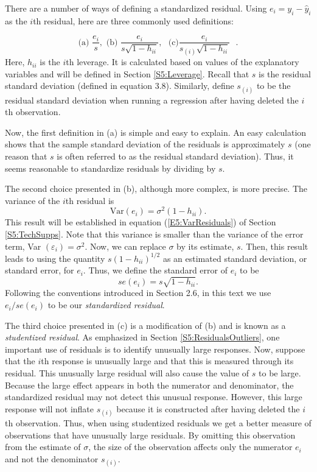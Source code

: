 There are a number of ways of defining a standardized residual.
Using $e_i = y_i-\hat{y}_i$ as the $i$th residual, here are three
commonly used definitions:

\begin{equation} \label{E5:StdResid}
\text{(a) }\frac{e_i}{s},\text{ \ \ \ (b) }\frac{e_i}{s\sqrt{
1-h_{ii}}}, \text { \  \   \   }\text{(c)
}\frac{e_i}{s_{(i)}\sqrt{1-h_{ii}}}\text{\ }.
\end{equation}
 \noindent Here, $h_{ii}$ is the $i$th leverage. It
is calculated based on values of the explanatory variables and will
be defined in Section \ref{S5:Leverage}. Recall that $s$ is the
residual standard deviation (defined in equation 3.8). Similarly,
define $s_{(i)}$ to be the residual standard deviation when running
a regression after having deleted the $i$th observation.

Now, the first definition in (a) is simple and easy to explain. An
easy calculation shows that the sample standard deviation of the
residuals is approximately $s$ (one reason that $s$ is often
referred to as the residual standard deviation). Thus, it seems
reasonable to standardize residuals by dividing by $s$.

The second choice presented in (b), although more complex, is more
precise. The variance of the $i$th residual is
\begin{equation*}
\mathrm{Var}(e_i)=\sigma ^2(1-h_{ii}).
\end{equation*}
This result will be established in equation (\ref{E5:VarResiduals})
of Section \ref{S5:TechSupps}. Note that this variance is smaller
than the variance of the error term, Var $(\varepsilon_i)=\sigma
^2$. Now, we can replace $\sigma $ by its estimate, $s$. Then, this
result leads to using the quantity $s(1-h_{ii})^{1/2}$ as an
estimated standard deviation, or standard error, for $e_i$. Thus, we
define the standard error of $e_i$ to be
\begin{equation*}
se(e_i)=s \sqrt{1-h_{ii}}.
\end{equation*}
Following the conventions introduced in Section 2.6, in this text we
use $e_i/se(e_i)$ to be our \textit{standardized residual}.


The third choice presented in (c) is a modification of (b) and is
known as a \textit{studentized residual}. As emphasized in Section
\ref{S5:ResidualsOutliers}, one important use of residuals is to
identify unusually large responses. Now, suppose that the $i$th
response is unusually large and that this is measured through its
residual. This unusually large residual will also cause the value of
$s$ to be large. Because the large effect appears in both the
numerator and denominator, the standardized residual may not detect
this unusual response. However, this large response will not inflate
$s_{(i)}$ because it is constructed after having deleted the $i$th
observation. Thus, when using studentized residuals we get a better
measure of observations that have unusually large residuals. By
omitting this observation from the estimate of $\sigma $, the size
of the observation affects only the numerator $e_i$ and not the
denominator $s_{(i)}$.

